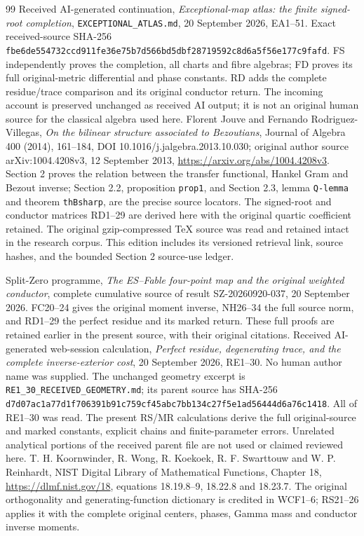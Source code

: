 \documentclass[11pt]{article}
\begin{document}
\begin{thebibliography}{99}
 Received AI-generated continuation,
\emph{Exceptional-map atlas: the finite signed-root completion},
\texttt{EXCEPTIONAL\_ATLAS.md}, 20 September 2026, EA1--51.
Exact received-source SHA-256
\texttt{fbe6de554732ccd911fe36e75b7d566bd5dbf28719592c8d6a5f56e177c9fafd}.
FS independently proves the completion, all charts and fibre algebras;
FD proves its full original-metric differential and phase constants.
RD adds the complete residue/trace comparison and its original conductor return.
The incoming account is preserved unchanged as received AI output;
it is not an original human source for the classical algebra used here.
 Florent Jouve and Fernando Rodriguez-Villegas,
\emph{On the bilinear structure associated to Bezoutians},
Journal of Algebra 400 (2014), 161--184,
DOI 10.1016/j.jalgebra.2013.10.030;
original author source arXiv:1004.4208v3, 12 September 2013,
\url{https://arxiv.org/abs/1004.4208v3}.
Section 2 proves the relation between the transfer functional,
Hankel Gram and Bezout inverse; Section 2.2, proposition
\texttt{prop1}, and Section 2.3, lemma \texttt{Q-lemma}
and theorem \texttt{thBsharp}, are the precise source locators.
The signed-root and conductor matrices RD1--29 are derived here
with the original quartic coefficient retained.
The original gzip-compressed TeX source was read and retained intact
in the research corpus. This edition includes its versioned retrieval
link, source hashes, and the bounded Section 2 source-use ledger.


 Split-Zero programme,
\emph{The ES--Fable four-point map and the original weighted conductor},
complete cumulative source of result SZ-20260920-037, 20 September 2026.
FC20--24 gives the original moment inverse, NH26--34 the full source norm,
and RD1--29 the perfect residue and its marked return. These full proofs
are retained earlier in the present source, with their original citations.
 Received AI-generated web-session calculation,
\emph{Perfect residue, degenerating trace, and the complete
inverse-exterior cost}, 20 September 2026, RE1--30.
No human author name was supplied. The unchanged geometry excerpt is
\texttt{RE1\_30\_RECEIVED\_GEOMETRY.md}; its parent source has SHA-256
\texttt{d7d07ac1a77d1f706391b91c759cf45abc7bb134c27f5e1ad56444d6a76c1418}.
All of RE1--30 was read. The present RS/MR calculations derive the full
original-source and marked constants, explicit chains and finite-parameter
errors. Unrelated analytical portions of the received parent file are not
used or claimed reviewed here.
 T. H. Koornwinder, R. Wong, R. Koekoek,
R. F. Swarttouw and W. P. Reinhardt,
NIST Digital Library of Mathematical Functions, Chapter 18,
\url{https://dlmf.nist.gov/18}, equations 18.19.8--9,
18.22.8 and 18.23.7. The original orthogonality and generating-function
dictionary is credited in WCF1--6; RS21--26 applies it with the complete
original centers, phases, Gamma mass and conductor inverse moments.



\end{thebibliography}
\end{document}
